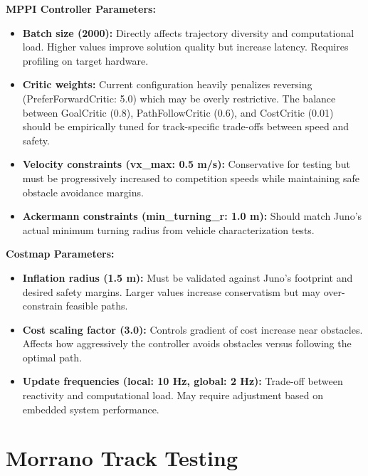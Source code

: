 \textbf{MPPI Controller Parameters:}
\begin{itemize}
    \item \textbf{Batch size (2000):} Directly affects trajectory diversity and computational load. Higher values improve solution quality but increase latency. Requires profiling on target hardware.

    \item \textbf{Critic weights:} Current configuration heavily penalizes reversing (PreferForwardCritic: 5.0) which may be overly restrictive. The balance between GoalCritic (0.8), PathFollowCritic (0.6), and CostCritic (0.01) should be empirically tuned for track-specific trade-offs between speed and safety.

    \item \textbf{Velocity constraints (vx\_max: 0.5 m/s):} Conservative for testing but must be progressively increased to competition speeds while maintaining safe obstacle avoidance margins.

    \item \textbf{Ackermann constraints (min\_turning\_r: 1.0 m):} Should match Juno's actual minimum turning radius from vehicle characterization tests.
\end{itemize}

\textbf{Costmap Parameters:}
\begin{itemize}
    \item \textbf{Inflation radius (1.5 m):} Must be validated against Juno's footprint and desired safety margins. Larger values increase conservatism but may over-constrain feasible paths.

    \item \textbf{Cost scaling factor (3.0):} Controls gradient of cost increase near obstacles. Affects how aggressively the controller avoids obstacles versus following the optimal path.

    \item \textbf{Update frequencies (local: 10 Hz, global: 2 Hz):} Trade-off between reactivity and computational load. May require adjustment based on embedded system performance.
\end{itemize}

\section{Morrano Track Testing}

